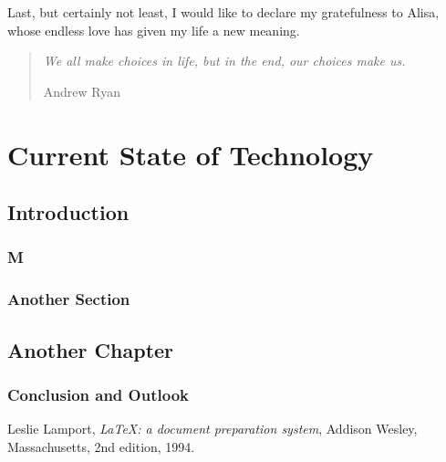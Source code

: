 \documentclass[
  twoside,
  11pt, a4paper,
  footinclude=true,
  headinclude=true,
  cleardoublepage=empty
]{scrreprt}
\begin{document}
Last, but certainly not least, I would like to declare my gratefulness to Alisa, whose endless love
has given my life a new meaning.

\singlespace

\clearpage
\vspace*{\fill}
\thispagestyle{empty} %
\begin{quotation}
    \em
    We all make choices in life, but in the end, our choices make us.

    \medskip
    \raggedleft
    Andrew Ryan
\end{quotation}
\vspace*{\fill}

\tableofcontents

\part{Current State of Technology}

\chapter{Introduction}
\lipsum[1]

\section{M}
\lipsum[1]

\section{Another Section}
\lipsum[1]

\chapter{Another Chapter}
\lipsum[1]

\section{Conclusion and Outlook}
\lipsum[1]

\listoffigures
 
\listoftables

\begin{thebibliography}{9}
        Leslie Lamport,
        \emph{\LaTeX: a document preparation system},
        Addison Wesley, Massachusetts,
        2nd edition,
        1994.
\end{thebibliography}
    
\end{document}
